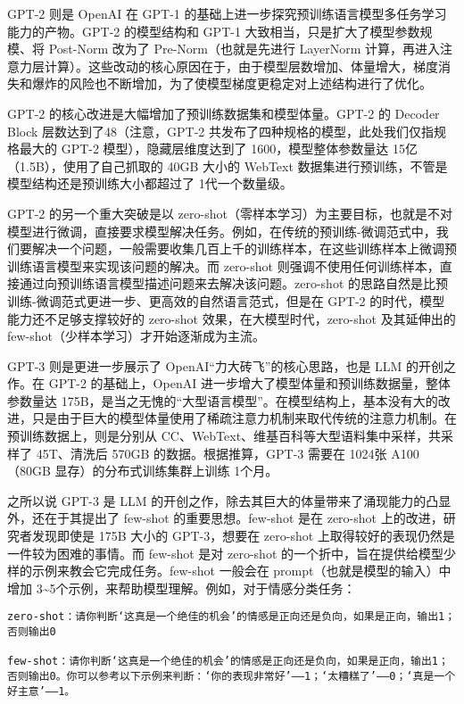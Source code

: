\documentclass[12pt,a4paper]{book}
\begin{document}
GPT-2 则是 OpenAI 在 GPT-1
的基础上进一步探究预训练语言模型多任务学习能力的产物。GPT-2 的模型结构和
GPT-1 大致相当，只是扩大了模型参数规模、将 Post-Norm 改为了
Pre-Norm（也就是先进行 LayerNorm
计算，再进入注意力层计算）。这些改动的核心原因在于，由于模型层数增加、体量增大，梯度消失和爆炸的风险也不断增加，为了使模型梯度更稳定对上述结构进行了优化。

GPT-2 的核心改进是大幅增加了预训练数据集和模型体量。GPT-2 的 Decoder
Block 层数达到了48（注意，GPT-2
共发布了四种规格的模型，此处我们仅指规格最大的 GPT-2
模型），隐藏层维度达到了 1600，模型整体参数量达
15亿（1.5B），使用了自己抓取的 40GB 大小的 WebText
数据集进行预训练，不管是模型结构还是预训练大小都超过了 1代一个数量级。

GPT-2 的另一个重大突破是以
zero-shot（零样本学习）为主要目标，也就是不对模型进行微调，直接要求模型解决任务。例如，在传统的预训练-微调范式中，我们要解决一个问题，一般需要收集几百上千的训练样本，在这些训练样本上微调预训练语言模型来实现该问题的解决。而
zero-shot
则强调不使用任何训练样本，直接通过向预训练语言模型描述问题来去解决该问题。zero-shot
的思路自然是比预训练-微调范式更进一步、更高效的自然语言范式，但是在
GPT-2 的时代，模型能力还不足够支撑较好的 zero-shot
效果，在大模型时代，zero-shot 及其延伸出的
few-shot（少样本学习）才开始逐渐成为主流。

GPT-3 则是更进一步展示了 OpenAI``力大砖飞''的核心思路，也是 LLM
的开创之作。在 GPT-2 的基础上，OpenAI
进一步增大了模型体量和预训练数据量，整体参数量达
175B，是当之无愧的``大型语言模型''。在模型结构上，基本没有大的改进，只是由于巨大的模型体量使用了稀疏注意力机制来取代传统的注意力机制。在预训练数据上，则是分别从
CC、WebText、维基百科等大型语料集中采样，共采样了 45T、清洗后 570GB
的数据。根据推算，GPT-3 需要在 1024张 A100（80GB
显存）的分布式训练集群上训练 1个月。

之所以说 GPT-3 是 LLM
的开创之作，除去其巨大的体量带来了涌现能力的凸显外，还在于其提出了
few-shot 的重要思想。few-shot 是在 zero-shot 上的改进，研究者发现即使是
175B 大小的 GPT-3，想要在 zero-shot
上取得较好的表现仍然是一件较为困难的事情。而 few-shot 是对 zero-shot
的一个折中，旨在提供给模型少样的示例来教会它完成任务。few-shot 一般会在
prompt（也就是模型的输入）中增加
3\textasciitilde5个示例，来帮助模型理解。例如，对于情感分类任务：

\begin{verbatim}
zero-shot：请你判断‘这真是一个绝佳的机会’的情感是正向还是负向，如果是正向，输出1；否则输出0

few-shot：请你判断‘这真是一个绝佳的机会’的情感是正向还是负向，如果是正向，输出1；否则输出0。你可以参考以下示例来判断：‘你的表现非常好’——1；‘太糟糕了’——0；‘真是一个好主意’——1。
\end{verbatim}
\end{document}
